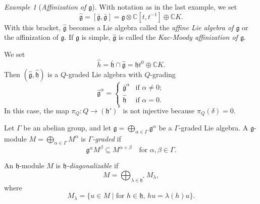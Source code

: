 \documentclass[a4paper, 12pt, reqno]{amsart}
\theoremstyle{remark}
\newtheorem{example}[theorem]{Example}
\begin{document}
\begin{example}[\emph{Affinization of $\mathfrak{g}$}]
  \label{exa:4}
  With notation as in the last example, we set
  \begin{equation*}
    \hat{\mathfrak{g}} = [\bar{\mathfrak{g}}, \bar{\mathfrak{g}}] = \mathfrak{g} \otimes \mathbb{C}[t, t^{-1}] \oplus \mathbb{C}K.
  \end{equation*}
  With this bracket, $\hat{\mathfrak{g}}$ becomes a Lie algebra called the \emph{affine Lie algebra of $\mathfrak{g}$} or the affinization of $\mathfrak{g}$.
  If $\mathfrak{g}$ is simple, $\hat{\mathfrak{g}}$ is called the \emph{Kac-Moody affinization of $\mathfrak{g}$}.

  We set
  \begin{equation*}
    \hat{h} = \bar{\mathfrak{h}} \cap \hat{\mathfrak{g}} = \mathfrak{h}t^0 \oplus \mathbb{C}K.
  \end{equation*}
  Then $(\hat{\mathfrak{g}}, \hat{\mathfrak{h}})$ is a $Q$-graded Lie algebra with $Q$-grading
  \begin{equation*}
    \hat{\mathfrak{g}}^{\alpha} =
    \begin{cases}
      \bar{\mathfrak{g}}^{\alpha} &\text{if $\alpha \neq 0$}; \\
      \hat{\mathfrak{h}} &\text{if $\alpha = 0$}.
    \end{cases}
  \end{equation*}
  In this case, the map $\pi_Q: Q \to (\mathfrak{h}')^*$ is not injective because $\pi_Q(\delta) = 0$.
\end{example}

Let $\Gamma$ be an abelian group, and let $\mathfrak{g} = \bigoplus_{\alpha \in \Gamma}\mathfrak{g}^{\alpha}$ be a $\Gamma$-graded Lie algebra.
A $\mathfrak{g}$-module $M = \bigoplus_{\alpha \in \Gamma}M^{\alpha}$ is \emph{$\Gamma$-graded} if
\begin{equation*}
  \mathfrak{g}^{\alpha}M^{\beta} \subseteq M^{\alpha + \beta} \quad \text{for $\alpha, \beta \in \Gamma$}.
\end{equation*}

An $\mathfrak{h}$-module $M$ is \emph{$\mathfrak{h}$-diagonalizable} if
\begin{equation*}
  M = \bigoplus_{\lambda \in \mathfrak{h}^*}M_{\lambda},
\end{equation*}
where
\begin{equation*}
  M_{\lambda} = \{u \in M \mid \text{for $h \in \mathfrak{h}$, $hu = \lambda(h)u$}\}.
\end{equation*}
\end{document}
